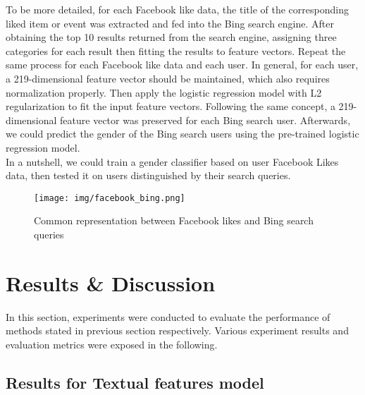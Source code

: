 \documentclass[runningheads]{llncs}
\begin{document}
	To be more detailed, for each Facebook like data, the title of the corresponding liked item or event was extracted and fed into the Bing search engine. After obtaining the top 10 results returned from the search engine, assigning three categories for each result then fitting the results to feature vectors. Repeat the same process for each Facebook like data and each user. In general, for each user, a 219-dimensional feature vector should be maintained, which also requires normalization properly. Then apply the logistic regression model with L2 regularization to fit the input feature vectors. Following the same concept, a 219-dimensional feature vector was preserved for each Bing search user. Afterwards, we could predict the gender of the Bing search users using the pre-trained logistic regression model. \\
	
	In a nutshell, we could train a gender classifier based on user Facebook Likes data, then tested it on users distinguished by their search queries.  \\
	
	\begin{figure}
		\centering
		\texttt{[image: img/facebook\_bing.png]}
		\caption{Common representation between Facebook likes and Bing search queries}
		\label{fig:facebook_bing}
	\end{figure}
	
	\section{Results \& Discussion}
	In this section, experiments were conducted to evaluate the performance of methods stated in previous section respectively. Various experiment results and evaluation metrics were exposed in the following.
	
	\subsection{Results for Textual features model}
	
\end{document}
